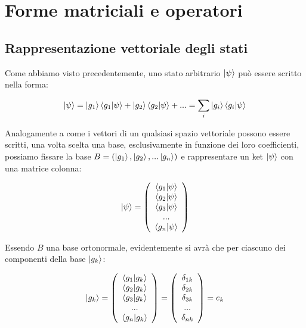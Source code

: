 \section{Forme matriciali e operatori}

\subsection{Rappresentazione vettoriale degli stati}

Come abbiamo visto precedentemente, uno stato arbitrario $\ket{\psi}$ può essere scritto nella forma:

	\[
		\ket{\psi} = \ket{g_1} \braket{g_1}{\psi} + \ket{g_2} \braket{g_2}{\psi} + ... = \sum_i \ket{g_i} \braket{g_i}{\psi}
	\]

Analogamente a come i vettori di un qualsiasi spazio vettoriale possono essere scritti, una volta scelta una base, esclusivamente in funzione dei loro coefficienti, possiamo fissare la base $B = (\ket{g_1}, \ket{g_2},... \ket{g_n})$ e rappresentare un ket $\ket{\psi}$ con una matrice colonna:

	\begin{equation} \label{eq:ketColumnMatrix}
		\ket{\psi} = \left ( \begin{array}{c}
				\braket{g_1}{\psi} \\
				\braket{g_2}{\psi} \\
				\braket{g_3}{\psi} \\
				... \\
				\braket{g_n}{\psi}
			\end{array}
		\right )
	\end{equation}

Essendo $B$ una base ortonormale, evidentemente si avrà che per ciascuno dei componenti della base $\ket{g_k}$:

	\begin{equation}
		\ket{g_k} = \left ( \begin{array}{c}
				\braket{g_1}{g_k} \\
				\braket{g_2}{g_k} \\
				\braket{g_3}{g_k} \\
				... \\
				\braket{g_n}{g_k}
			\end{array}
		\right ) = \left ( \begin{array}{c}
				\delta_{1k} \\
				\delta_{2k} \\
				\delta_{3k} \\
				... \\
				\delta_{nk}
			\end{array}
		\right ) = e_k
	\end{equation}

